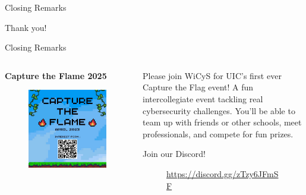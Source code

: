 \documentclass{beamer}
\begin{document}
\begin{frame}{Closing Remarks}
	\begin{center}
		\Huge Thank you!
	\end{center}
\end{frame}

\begin{frame}{Closing Remarks}
		\begin{columns}
		\begin{column}{0.5\textwidth}
			\textbf{Capture the Flame 2025}
		\begin{figure}
			\centering
			\includegraphics[width=0.7\linewidth]{ctf.png}
			\caption{}
			\label{fig:ctf}
		\end{figure}
		\end{column}
		\begin{column}{0.5\textwidth}
			Please join WiCyS for UIC's first ever Capture the Flag event! A fun intercollegiate event tackling real cybersecurity challenges. You'll be able to team up with friends or other schools, meet professionals, and compete for fun prizes. 
			
			\bigskip
			Join our Discord!
			
			\begin{figure}
				\centering
				
				\caption{\url{https://discord.gg/zTzy6JFmSF}}
			\end{figure}
		\end{column}
	\end{columns}
\end{frame}
\end{document}

